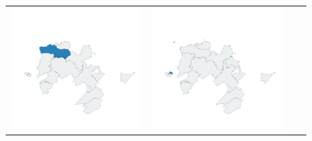 \begin{figure}
\begin{tabularx}{1\textwidth}{XXXX}
\includegraphics[width=1\linewidth]{images/ch6/loading/09}&
\includegraphics[width=1\linewidth]{images/ch6/loading/10}&

\end{tabularx}
\end{figure}
